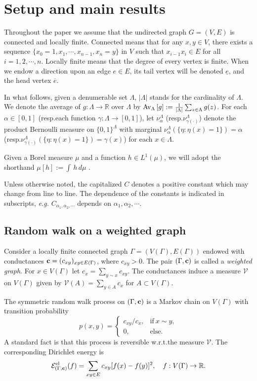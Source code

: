 \documentclass[11pt]{amsart}
\theoremstyle{plain}
\theoremstyle{definition}
\theoremstyle{remark}
\newcommand{\avg}[2]{{\rm Av}_{#2}\left[{#1}\right]}
\begin{document}
\section{Setup and main results} \label{sec:main}

Throughout the paper we assume that the undirected graph $G=(V,E)$ is connected and locally finite. 
Connected means that for any $x, y\in V$, there exists a sequence $\{x_0=1, x_1, \cdots, x_{n-1}, x_n=y\}$ in $V$ such that $x_{i-1} x_i \in E$ for all $i=1,2,\cdots, n$.
Locally finite means that the degree of every vertex is finite.
When we endow a direction upon an edge $e\in E$, its tail vertex will be denoted $\underline{e}$, and the head vertex $\overline{e}$.

In what follows, given a denumerable set $\Lambda$, $|\Lambda|$ stands for the cardinality of $\Lambda$. We denote the average of $g: \Lambda\to\mathbb{R}$ over $\Lambda$ by $\avg{g}{\Lambda} := \frac{1}{|\Lambda|}\sum_{z\in \Lambda} g(z)$. For each $\alpha\in [0,1]$ (resp.\@ each function $\gamma: \Lambda \to [0,1]$), let $\nu_\alpha^\Lambda$ (resp.\@ $\nu_{\gamma(\cdot)}^\Lambda$) denote the product Bernoulli measure on $\{0,1\}^\Lambda$ with marginal $\nu_\alpha^\Lambda\left(\{\eta: \eta(x)=1\}\right)=\alpha$ (resp.\@ $\nu_{\gamma(\cdot)}^\Lambda\left(\{\eta:\eta(x)=1\}\right)=\gamma(x)$) for each $x\in \Lambda$.

Given a Borel measure $\mu$ and a function $h\in L^1(\mu)$, we will adopt the shorthand $\mu[h] := \int\, h\,d\mu$ . 

Unless otherwise noted, the capitalized $C$ denotes a positive constant which may change from line to line. The dependence of the constants is indicated in subscripts, \emph{e.g.} $C_{\alpha_1, \alpha_2, \cdots}$ depends on $\alpha_1, \alpha_2, \cdots$. 
 
\subsection{Random walk on a weighted graph}

Consider a locally finite connected graph $\Gamma= (V(\Gamma), E(\Gamma))$ endowed with conductances ${\bf c} = (c_{xy})_{xy\in E(\Gamma)}$, where $c_{xy} > 0$. The pair $(\Gamma, {\bf c})$ is called a \emph{weighted graph}. For $x\in V(\Gamma)$ let $c_x = \sum_{y\sim x} c_{xy}$. The conductances induce a measure $\mathcal{V}$ on $V(\Gamma)$ given by 
$
\mathcal{V}(A) = \sum_{y\in A} c_x
$
for $A\subset V(\Gamma)$. 

The symmetric random walk process on $(\Gamma, {\bf c})$ is a Markov chain on $V(\Gamma)$ with transition probability
\[
p(x,y) = \left\{\begin{array}{ll} c_{xy}/c_x, & \text{if}~x\sim y,\\ 0, &\text{else}.\end{array}\right.
\]
A standard fact is that this process is reversible w.r.t.\@ the measure $\mathcal{V}$. The corresponding Dirichlet energy is
\[
\mathcal{E}^{\rm el}_{(\Gamma,{\bf c})}(f) = \sum_{xy\in E} c_{xy} [f(x)-f(y)]^2,\quad f: V(\Gamma)\to\mathbb{R}.
\]
\end{document}
